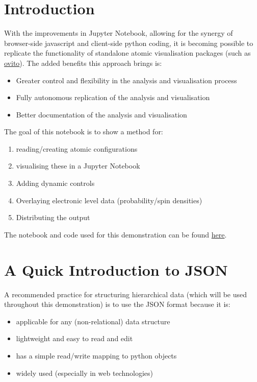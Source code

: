 \documentclass[10pt,parskip=half,
	toc=sectionentrywithdots,
	bibliography=totocnumbered,
	captions=tableheading,numbers=noendperiod]{scrartcl}
\providecommand{\tightlist}{%
  \setlength{\itemsep}{0pt}\setlength{\parskip}{0pt}}
\begin{document}
\section{Introduction}\label{introduction}

With the improvements in Jupyter Notebook, allowing for the synergy of
browser-side javascript and client-side python coding, it is becoming
possible to replicate the functionality of standalone atomic
visualisation packages (such as
\href{https://ovito.org/index.php/about}{ovito}). The added benefits
this approach brings is:

\begin{itemize}
\tightlist
\item
  Greater control and flexibility in the analysis and visualisation
  process
\item
  Fully autonomous replication of the analysis and visualisation
\item
  Better documentation of the analysis and visualisation
\end{itemize}

The goal of this notebook is to show a method for:

\begin{enumerate}
\def\labelenumi{\arabic{enumi}.}
\tightlist
\item
  reading/creating atomic configurations
\item
  visualising these in a Jupyter Notebook
\item
  Adding dynamic controls
\item
  Overlaying electronic level data (probability/spin densities)
\item
  Distributing the output
\end{enumerate}

The notebook and code used for this demonstration can be found
\href{https://github.com/chrisjsewell/chrisjsewell.github.io/tree/master/3d_atomic}{here}.

\section{A Quick Introduction to
JSON}\label{a-quick-introduction-to-json}

A recommended practice for structuring hierarchical data (which will be
used throughout this demonstration) is to use the JSON format because it
is:

\begin{itemize}
\tightlist
\item
  applicable for any (non-relational) data structure
\item
  lightweight and easy to read and edit
\item
  has a simple read/write mapping to python objects
\item
  widely used (especially in web technologies)
\end{itemize}
\end{document}
